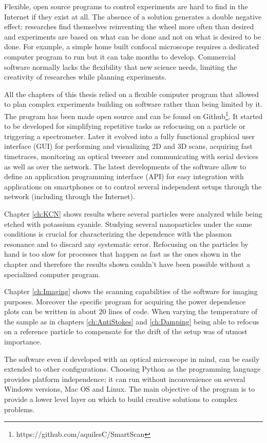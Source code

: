 Flexible, open source programs to control experiments are hard to find in the
Internet if they exist at all. The absence of a solution generates a double
negative effect: researches find themselves reinventing the wheel more often
than desired and experiments are based on what can be done and not on what is
desired to be done. For example, a simple home built confocal microscope
requires a dedicated computer program to run but it can take months to develop.
Commercial software normally lacks the flexibility that new science needs,
limiting the creativity of researches while planning experiments.

All the chapters of this thesis relied on a flexible computer program that
allowed to plan complex experiments building on software rather than being
limited by it. The program has been made open source and can be found on
Github\footnote{https://github.com/aquilesC/SmartScan}. It started to be
developed for simplifying repetitive tasks as refocusing on a particle or
triggering a spectrometer. Later it evolved into a fully functional graphical
user interface (GUI) for performing and visualizing $2$D and $3$D scans,
acquiring fast timetraces, monitoring an optical tweezer and communicating with
serial devices as well as over the network. The latest developments of the
software allow to define an application programming interface (API) for easy
integration with applications on smartphones or to control several independent
setups through the network (including through the Internet).

Chapter \ref{ch:KCN} shows results where several particles were analyzed while
being etched with potassium cyanide. Studying several nanoparticles under the
same conditions is crucial for characterizing the dependence with the plasmon
resonance and to discard any systematic error. Refocusing on the particles by
hand is too slow for processes that happen as fast as the ones shown in the
chapter and therefore the results shown couldn't have been possible without a
specialized computer program. 

Chapter \ref{ch:Imaging} shows the scanning capabilities of the software for
imaging purposes. Moreover the specific program for acquiring the power
dependence plots can be written in about $20$ lines of code. When varying the
temperature of the sample as in chapters \ref{ch:AntiStokes} and
\ref{ch:Damping} being able to refocus on a reference particle to compensate for
the drift of the setup was of utmost importance.

The software even if developed with an optical microscope in mind, can be easily
extended to other configurations. Choosing Python as the programming language
provides platform independence; it can run without inconvenience on several
Windows versions, Mac OS and Linux. The main objective of the program is to
provide a lower level layer on which to build creative solutions to complex
problems.


